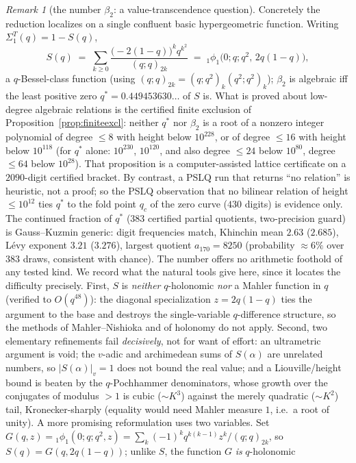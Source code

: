 \documentclass[11pt]{article}
\theoremstyle{plain}
\theoremstyle{definition}
\theoremstyle{remark}
\newtheorem{remark}[theorem]{Remark}
\begin{document}
\begin{remark}[the number $\beta_2$: a value-transcendence question]
Concretely the reduction localizes on a single confluent basic hypergeometric function. Writing
$\Sigma_1^T(q)=1-S(q)$,
\[
   S(q)\;=\;\sum_{k\ge0}\frac{\bigl(-2(1-q)\bigr)^k q^{k^2}}{(q;q)_{2k}}
   \;=\;{}_1\phi_1\!\bigl(0;q;q^2,\,2q(1-q)\bigr),
\]
a $q$-Bessel-class function (using $(q;q)_{2k}=(q;q^2)_k(q^2;q^2)_k$); $\beta_2$ is algebraic iff the
least positive zero $q^\ast=0.449453630\ldots$ of $S$ is. What is proved about low-degree algebraic
relations is the certified finite exclusion of Proposition~\ref{prop:finiteexcl}: neither $q^\ast$ nor
$\beta_2$ is a root of a nonzero integer polynomial of degree $\le8$ with height below $10^{228}$, or of
degree $\le16$ with height below $10^{118}$ (for $q^\ast$ alone: $10^{230}$, $10^{120}$, and also degree
$\le24$ below $10^{80}$, degree $\le64$ below $10^{28}$). That proposition is a computer-assisted lattice
certificate on a $2090$-digit certified bracket. By contrast, a PSLQ run that returns ``no relation'' is
heuristic, not a proof; so the PSLQ observation that no bilinear relation of height $\le10^{12}$ ties
$q^\ast$ to the fold point $q_c$ of the zero curve ($430$ digits) is evidence only. The continued fraction of
$q^\ast$ ($383$ certified partial quotients, two-precision guard) is Gauss--Kuzmin generic:
digit frequencies match, Khinchin mean $2.63$ ($2.685$), L\'evy exponent $3.21$ ($3.276$),
largest quotient $a_{170}=8250$ (probability $\approx6\%$ over $383$ draws, consistent with chance).
The number offers no arithmetic foothold of any tested kind. We record what the natural tools give here,
since it locates the difficulty precisely. First, $S$ is \emph{neither} $q$-holonomic \emph{nor} a
Mahler function in $q$ (verified to $O(q^{48})$): the diagonal specialization $z=2q(1-q)$ ties the
argument to the base and destroys the single-variable $q$-difference structure, so the methods of
Mahler--Nishioka \cite{Nishioka1996} and of holonomy do not apply. Second, two elementary refinements fail
\emph{decisively}, not for want of effort: an ultrametric argument is void; the $v$-adic and
archimedean sums of $S(\alpha)$ are unrelated numbers, so $|S(\alpha)|_v=1$ does not bound the real
value; and a Liouville/height bound is beaten by the $q$-Pochhammer denominators, whose growth over
the conjugates of modulus $>1$ is cubic ($\sim\!K^3$) against the merely quadratic ($\sim\!K^2$) tail,
Kronecker-sharply (equality would need Mahler measure $1$, i.e.\ a root of unity). A more promising reformulation uses two variables. Set $G(q,z)={}_1\phi_1(0;q;q^2,z)=\sum_k(-1)^k
q^{k(k-1)}z^k/(q;q)_{2k}$, so $S(q)=G(q,2q(1-q))$; unlike $S$, the function $G$ \emph{is} $q$-holonomic

\end{remark}
\end{document}
